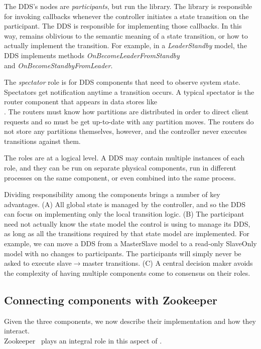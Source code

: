 The DDS's nodes are \emph{participants}, but run the \helix library.  The
library is responsible for invoking callbacks whenever the controller initiates
a state transition on the participant.  The DDS is responsible for implementing
those callbacks.  In this way, \helix remains oblivious to the semantic meaning
of a state transition, or how to actually implement the transition.  For
example, in a \emph{LeaderStandby} model, the DDS implements methods
\emph{OnBecomeLeaderFromStandby} \\ and \emph{OnBecomeStandbyFromLeader}.

The \emph{spectator} role is for DDS components that need to observe system
state.  Spectators get notification anytime a transition occurs.  A typical
spectator is the router component that appears in data stores like \\ \ES.  The
routers must know how partitions are distributed in order to direct client
requests and so must be get up-to-date with any partition moves.  The routers do
not store any partitions themselves, however, and the controller never executes
transitions against them.

The roles are at a logical level.  A DDS may contain multiple instances of each
role, and they can be run on separate physical components, run in different
processes on the same component, or even combined into the same process.
 
Dividing responsibility among the components brings a number of key
advantages.  (A) All global state is managed by the controller, and so the DDS can
focus on implementing only the local transition logic.  (B) The participant need
not actually know the state model the control is using to manage its DDS, as long as all the
transitions required by that state model are implemented.  
For example, we can move a DDS from a MasterSlave model to a read-only SlaveOnly
model with no changes to participants.  The participants will simply never
be asked to execute slave$\rightarrow$master transitions.  (C) A
central decision maker avoids the complexity of having multiple components come
to consensus on their roles.    

\subsection{Connecting components with Zookeeper}

Given the three \helix components, we now describe their implementation and how
they interact. \\ Zookeeper~\cite{zookeeper} plays an integral role in this aspect
of \helix.


